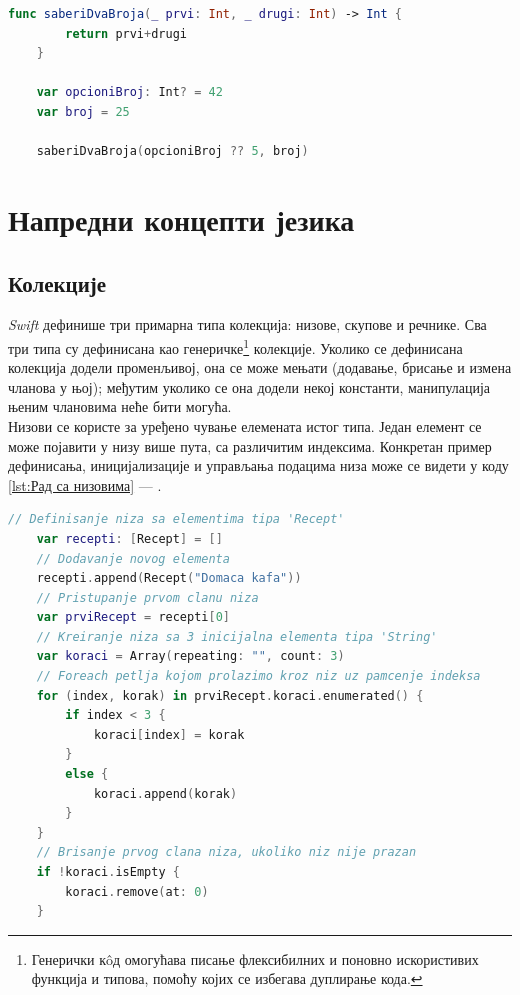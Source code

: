 \documentclass[12pt,oneside]{memoir}
\begin{document}
\begin{lstlisting}[caption=\textit{{Одмотавање опционе променљиве задавањем подразумеване вредности}}, label={lst:Одмотавање опционе променљиве задавањем подразумеване вредности}, language=Swift, frame=single]
    func saberiDvaBroja(_ prvi: Int, _ drugi: Int) -> Int {
        return prvi+drugi
    }
    
    var opcioniBroj: Int? = 42
    var broj = 25
    
    saberiDvaBroja(opcioniBroj ?? 5, broj)
\end{lstlisting}

\section{Напредни концепти језика}

\subsection{Колекције}
\label{subsec:Колекције}

\indent \textit{Swift} дефинише три примарна типа колекција: низове, скупове и речнике. Сва три типа су дефинисана као генеричке\footnote{Генерички к\^{o}д омогућава писање флексибилних и поновно искористивих функција и типова, помоћу којих се избегава дуплирање кода.} колекције. Уколико се дефинисана колекција додели променљивој, она се може мењати (додавање, брисање и измена чланова у њој); међутим уколико се она додели некој константи, манипулација њеним члановима неће бити могућа. \\
\indent Низови се користе за уређено чување елемената истог типа. Један елемент се може појавити у низу више пута, са различитим индексима. Конкретан пример дефинисања, иницијализације и управљања подацима низа може се видети у коду \ref{lst:Рад са низовима} --- .

\begin{lstlisting}[caption=\textit{{Рад са низовима}}, label={lst:Рад са низовима}, language=Swift, frame=single]
    // Definisanje niza sa elementima tipa 'Recept'
    var recepti: [Recept] = []
    // Dodavanje novog elementa
    recepti.append(Recept("Domaca kafa"))
    // Pristupanje prvom clanu niza
    var prviRecept = recepti[0]
    // Kreiranje niza sa 3 inicijalna elementa tipa 'String'
    var koraci = Array(repeating: "", count: 3)
    // Foreach petlja kojom prolazimo kroz niz uz pamcenje indeksa
    for (index, korak) in prviRecept.koraci.enumerated() {
        if index < 3 {
            koraci[index] = korak
        }
        else {
            koraci.append(korak)
        }
    }
    // Brisanje prvog clana niza, ukoliko niz nije prazan
    if !koraci.isEmpty {
        koraci.remove(at: 0)
    }
\end{lstlisting}
\end{document}
